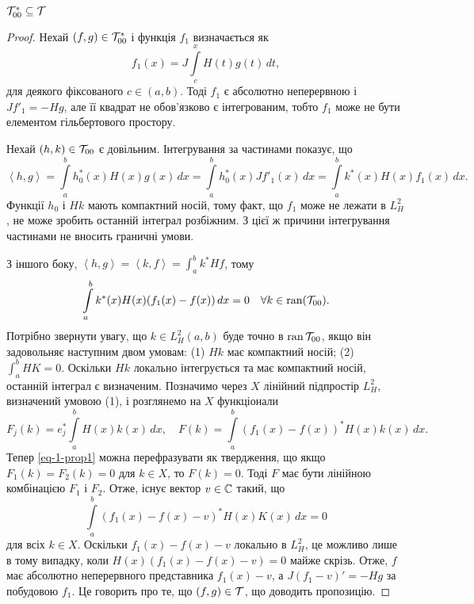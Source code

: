 \begin{proposition} \label{prop-1-relations}
	$\mathcal{T}^*_{00}\subseteq\mathcal{T}$
\end{proposition}
\begin{proof}
	Нехай $(f,g)\in\mathcal{T}^*_{00}$ і функція $f_1$ визначається як
	\begin{equation*}
		f_1(x) = J\int\limits_c^x H(t)g(t)\,dt,
	\end{equation*}
	для деякого фіксованого $c\in(a,b)$. Тоді $f_1$ є абсолютно неперервною і $Jf'_1=-Hg$, але її квадрат не обов'язково є інтегрованим, тобто $f_1$ може не бути елементом гільбертового простору.

	Нехай $(h,k)\in\mathcal{T}_{00}$ є довільним. Інтегрування за частинами показує, що
	\begin{equation*}
		\left<h,g\right> = \int\limits_a^b h^*_0(x)H(x)g(x)\,dx = \int\limits_a^b h^*_0(x)Jf'_1(x)\,dx = \int\limits_a^b k^*(x)H(x)f_1(x)\,dx.
	\end{equation*}
	Функції $h_0$ і $Hk$ мають компактний носій, тому факт, що $f_1$ може не лежати в $L^2_H$, не може зробить останній інтеграл розбіжним. З цієї ж причини інтегрування частинами не вносить граничні умови. 

	З іншого боку, $\left<h,g\right>=\left<k,f\right>=\int_a^b k^*Hf$, тому
	\begin{equation} \label{eq-1-prop1}
		\int\limits_a^b k^*(x)H(x)(f_1(x)-f(x))\,dx = 0 \quad \forall k\in \operatorname{ran}(\mathcal{T}_{00}).
	\end{equation}
	Потрібно звернути увагу, що $k\in L^2_H(a,b)$ буде точно в $\operatorname{ran} \mathcal{T}_{00}$, якщо він задовольняє наступним двом умовам: (1) $Hk$ має компактний носій; (2) $\int_a^b HK = 0$. Оскільки $Hk$ локально інтегрується та має компактний носій, останній інтеграл є визначеним. Позначимо через $X$ лінійний підпростір $L^2_H$, визначений умовою (1), і розглянемо на $X$ функціонали
	\begin{equation*}
		F_j(k) = e^*_j \int\limits_a^b H(x)k(x)\,dx, \quad F(k) = \int\limits_a^b (f_1(x)-f(x))^*H(x)k(x)\,dx.
	\end{equation*}
	Тепер \ref{eq-1-prop1} можна перефразувати як твердження, що якщо $F_1(k)=F_2(k)=0$ для $k\in X$, то $F(k)=0$. Тоді $F$ має бути лінійною комбінацією $F_1$ і $F_2$. Отже, існує вектор $v\in\mathbb{C}$ такий, що 
	\begin{equation*}
		\int\limits_a^b (f_1(x)-f(x)-v)^*H(x)K(x)\,dx = 0
	\end{equation*}
	для всіх $k\in X$. Оскільки $f_1(x)-f(x)-v$ локально в $L^2_H$, це можливо лише в тому випадку, коли $H(x)(f_1(x)-f(x)-v)=0$ майже скрізь. Отже, $f$ має абсолютно неперервного представника $f_1(x)-v$, а $J(f_1-v)'=-Hg$ за побудовою $f_1$. Це говорить про те, що $(f,g)\in\mathcal{T}$, що доводить пропозицію.
\end{proof}

